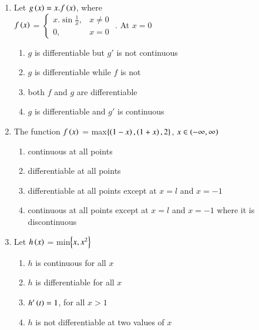 \documentclass[journal,12pt,twocolumn]{IEEEtran}
\theoremstyle{remark}
\begin{document}
\begin{enumerate}
    \item 
    Let $g\left(x\right)=x.f\left(x\right)$, where\\[6pt] $f\left(x\right)$ = $\begin{cases}
        x.\sin\frac{1}{x}, & x\neq 0\\
        0, & x=0
    \end{cases}$
    . At $x=0$
    
    \hfill 
    {}
    
    \begin{enumerate}[label=(\alph*)]
        
        \item $g$ is differentiable but $g'$ is not continuous
        \item $g$ is differentiable while $f$ is not
        \item both $f$ and $g$ are differentiable
        \item $g$ is differentiable and $g'$ is continuous 
    \end{enumerate}

    \item 
	    The function $f\left(x\right)$ = max$\left\{\left(1-x\right),\left(1+x\right),2\right\}$, $x\in \left(-\infty,\infty\right)$ 

    \hfill 
    {}
    
    \begin{enumerate}[label=(\alph*)]
        
        \item continuous at all points
        \item differentiable at all points
        \item differentiable at all points except at $x=l$ and $x=-1$
        \item continuous at all points except at $x=l$ and $x=-1$ where it is discontinuous
    \end{enumerate}


    \item 
    Let $h\left(x\right)$ = min$\left\{x,x^{2}\right\}$ 

    \hfill 
    {}

    \begin{enumerate}[label=(\alph*)]
        
        \item $h$ is continuous for all $x$
        \item $h$ is differentiable for all $x$
        \item $h'\left(t\right)=1$, for all $x >1$
        \item $h$ is not differentiable at two values of $x$
    \end{enumerate}



\end{enumerate}
\end{document}
